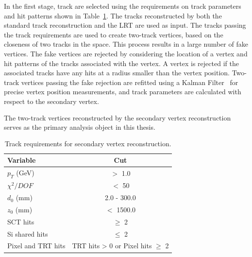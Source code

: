 In the first stage, track are selected using the requirements on track parameters and hit patterns shown in Table~\ref{table:vertex_track_selection_simple}. The tracks reconstructed by both the standard track reconstruction and the LRT are used as input. The tracks passing the track requirements are used to create two-track vertices, based on the closeness of two tracks in the space. This process results in a large number of fake vertices. The fake vertices are rejected by considering the location of a vertex and hit patterns of the tracks associated with the vertex. A vertex is rejected if the associated tracks have any hits at a radius smaller than the vertex position. Two-track vertices passing the fake rejection are refitted using a Kalman Filter~\cite{Kalman:434680} for precise vertex position measurements, and track parameters are calculated with respect to the secondary vertex.

The two-track vertices reconstructed by the secondary vertex reconstruction serves as the primary analysis object in this thesis. %







\begin{table}[!htb]
  \centering
  \begin{tabular}{ l c }
    \hline
    \hline
	Variable      		& Cut                                         	\\
    \hline
	$p_{T}$ (GeV)		& $>$ 1.0										\\
	$\chi^{2} / DOF$	& $<$ 50  										\\
	$d_{0}$	(mm)		& 2.0 - 300.0									\\
	$z_{0}$ (mm)		& $<$ 1500.0									\\
	SCT hits			& $\geq$ 2										\\
	Si shared hits	    & $\leq$ 2										\\
	Pixel and TRT hits  & TRT hits > 0 or Pixel hits $\geq$ 2			\\
    \hline
    \hline
  \end{tabular}
  \caption{Track requirements for secondary vertex reconstruction.}
  \label{table:vertex_track_selection_simple}
\end{table}


